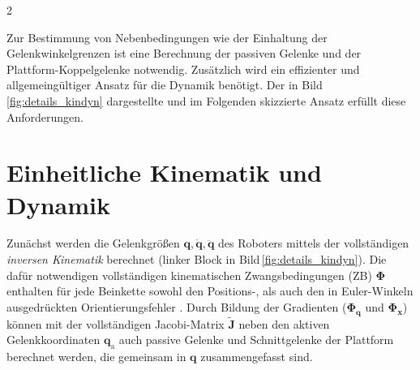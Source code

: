 \documentclass[fleqn,a4paper,10pt]{article}
\newcommand{\bm}[1]{\mathbf{#1}}
\renewcommand{\Phi}[1]{\varPhi{#1}}
\begin{document}
\begin{multicols}{2}
\begin{figure*}
	\centering
	
	\label{fig:uebersicht}
\end{figure*}


Zur Bestimmung von Nebenbedingungen wie der Einhaltung der Gelenkwinkelgrenzen ist eine Berechnung der passiven Gelenke und der Plattform-Koppelgelenke notwendig.
Zusätzlich wird ein effizienter und allgemeingültiger Ansatz für die Dynamik benötigt.
Der in Bild\,\ref{fig:details_kindyn} dargestellte und im Folgenden skizzierte  Ansatz erfüllt diese Anforderungen.

\section{Einheitliche Kinematik und Dynamik}

\begin{figure*}
	\centering
	
	\label{fig:details_kindyn}
\end{figure*}

Zunächst werden die Gelenkgrößen $\bm{q},\dot{\bm{q}},\ddot{\bm{q}}$ des Roboters mittels der vollständigen \emph{inversen Kinematik} berechnet (linker Block in Bild\,\ref{fig:details_kindyn}).
Die dafür notwendigen vollständigen kinematischen Zwangsbedingungen (\glqq{}ZB\grqq{}) $\bm{\Phi}$ enthalten für jede Beinkette sowohl den Positions-, als auch den in Euler-Winkeln ausgedrückten Orientierungsfehler \cite{SchapplerTapOrt2019c}.
Durch Bildung der Gradienten ($\bm{\Phi}_\bm{q}$ und $\bm{\Phi}_\bm{x}$) können mit der vollständigen Jacobi-Matrix $\tilde{\bm{J}}$ neben den aktiven Gelenkkoordinaten $\bm{q}_\mathrm{a}$ auch passive Gelenke und Schnittgelenke der Plattform berechnet werden, die gemeinsam in $\bm{q}$ zusammengefasst sind.


\end{multicols}
\end{document}
